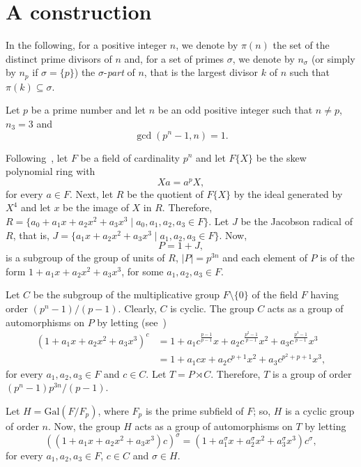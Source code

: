 \documentclass{amsart}
\begin{document}
\section{A construction}\label{construction}
In the following, for a positive integer $n$, we denote by $\pi(n)$ the set of the distinct prime divisors of $n$ and,
for a set of primes $\sigma$, we denote by $n_{\sigma}$ (or simply by $n_p$ if $\sigma = \{ p\}$) the $\sigma$-\emph{part} of $n$, that is the largest divisor $k$ of $n$ such that $\pi(k) \subseteq \sigma$.


Let $p$ be a prime number and let $n$ be an odd positive integer such that  $n \neq p$,  $n_3 = 3$  and
\begin{equation}\label{condition}\gcd\left(p^n-1,n\right)=1.
\end{equation}

Following~\cite{isaacs1}, let $F$ be a field of cardinality $p^n$ and let $F\{X\}$ be the skew polynomial ring with
$$Xa=a^pX,$$
for every $a\in F$.
 Next, let $R$ be the quotient of $F\{X\}$ by the ideal generated by $X^4$ and let $x$ be the image of $X$ in $R$. Therefore, $R=\{a_0+a_1 x+a_2 x^2+a_3 x^3\mid a_0,a_1,a_2,a_3\in F\}$.
Let $J$ be the Jacobson radical of $R$, that is, $J=\{a_1x+a_2x^2+a_3x^3\mid a_1,a_2,a_3\in F\}$. Now,
$$P=1+J,$$
is a subgroup of the group of units of $R$, $|P|=p^{3n}$ and each element of $P$ is of the form
$1+a_1x+a_2x^2+a_3x^3$, for some $a_1,a_2,a_3\in F$.


Let $C$ be the subgroup of the multiplicative group $F\setminus\{0\}$ of the field $F$ having order $(p^n-1)/(p-1)$. Clearly, $C$ is cyclic. The group $C$ acts as a group of automorphisms on $P$ by letting (see~\cite{HO})
\begin{align}\label{eq1}
(1+a_1x+a_2x^2+a_3x^3)^c
&=1+a_1c^{\frac{p-1}{p-1}}x+a_2c^{\frac{p^2-1}{p-1}}x^2+a_3c^{\frac{p^3-1}{p-1}}x^3\\\nonumber
&=1+a_1cx+a_2c^{p+1}x^2+a_3c^{p^2+p+1}x^3,
\end{align}
for every $a_1,a_2,a_3\in F$ and $c\in C$.
Let $T=P\rtimes C$. Therefore, $T$ is a group of order $(p^n-1)p^{3n}/(p-1)$.


Let
$H=\mathrm{Gal}(F/F_p)$,   where $F_p$ is the prime subfield of $F$; so, $H$ is a cyclic group  of order $n$.
Now, the group $H$ acts as a group of automorphisms  on $T$ by letting
\begin{equation}\label{eq2}
((1+a_1x+a_2x^2+a_3x^3) c)^\sigma=(1+a_1^\sigma x+a_2^\sigma x^2+a_3^\sigma x^3)  c^\sigma,
\end{equation}
for every $a_1,a_2,a_3\in F$, $c\in C$ and $\sigma\in H$.
\end{document}

